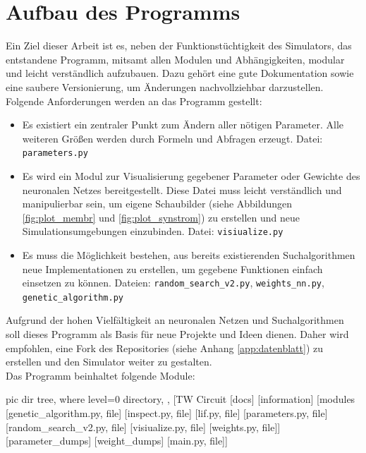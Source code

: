 \section{Aufbau des Programms}
\label{sec:imp_module}
	Ein Ziel dieser Arbeit ist es, neben der Funktionstüchtigkeit des Simulators, das entstandene Programm, mitsamt allen Modulen und Abhängigkeiten, modular und leicht verständlich aufzubauen. Dazu gehört eine gute Dokumentation sowie eine saubere Versionierung, um Änderungen nachvollziehbar darzustellen.	Folgende Anforderungen werden an das Programm gestellt:
	\begin{itemize}
		\item Es existiert ein zentraler Punkt zum Ändern aller nötigen Parameter. Alle weiteren Größen werden durch Formeln und Abfragen erzeugt.
		\subitem Datei: \texttt{parameters.py}
		\item Es wird ein Modul zur Visualisierung gegebener Parameter oder Gewichte des neuronalen Netzes bereitgestellt. Diese Datei muss leicht verständlich und manipulierbar sein, um eigene Schaubilder (siehe Abbildungen \ref{fig:plot_membr} und \ref{fig:plot_synstrom}) zu erstellen und neue Simulationsumgebungen einzubinden.
		\subitem Datei: \texttt{visiualize.py}
		\item Es muss die Möglichkeit bestehen, aus bereits existierenden Suchalgorithmen neue Implementationen zu erstellen, um gegebene Funktionen einfach einsetzen zu können.
		\subitem Dateien: \texttt{random\_search\_v2.py}, \texttt{weights\_nn.py}, \texttt{genetic\_algorithm.py}
	\end{itemize}
	Aufgrund der hohen Vielfältigkeit an neuronalen Netzen und Suchalgorithmen soll dieses Programm als Basis für neue Projekte und Ideen dienen. Daher wird empfohlen, eine Fork des Repositories (siehe Anhang \ref{app:datenblatt}) zu erstellen und den Simulator weiter zu gestalten.\\
	Das Programm beinhaltet folgende Module:\\
	\begin{minipage}{0.35\textwidth}
		\vspace{0.3cm}
		\begin{forest}
			pic dir tree,
			where level=0{}{%
				directory,
			},
			[TW Circuit
				[docs]
				[information]
				[modules
					[genetic\_algorithm.py, file]
					[inspect.py, file]
					[lif.py, file]
					[parameters.py, file]
					[random\_search\_v2.py, file]
					[visiualize.py, file]
					[weights.py, file]]
				[parameter\_dumps]
				[weight\_dumps]
				[main.py, file]]
		\end{forest}
	\end{minipage}
